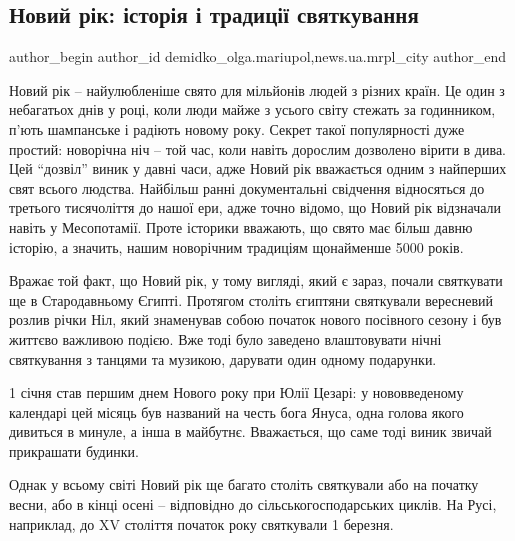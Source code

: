  
 
 
 
 
 
\subsection{Новий рік: історія і традиції святкування}
\label{sec:30_12_2017.stz.news.ua.mrpl_city.1.novyj_rik_istoria_tradicii}
 
\ifcmt
 author_begin
   author_id demidko_olga.mariupol,news.ua.mrpl_city
 author_end
\fi

Новий рік – найулюбленіше свято для мільйонів людей з різних країн. Це один з
небагатьох днів у році, коли люди майже з усього світу стежать за годинником,
п'ють шампанське і радіють новому року. Секрет такої популярності дуже простий:
новорічна ніч – той час, коли навіть дорослим дозволено вірити в дива. Цей
\enquote{дозвіл} виник у давні часи, адже Новий рік вважається одним з найперших свят
всього людства. Найбільш ранні документальні свідчення відносяться до третього
тисячоліття до нашої ери, адже точно відомо, що Новий рік відзначали навіть у
Месопотамії. Проте історики вважають, що свято має більш давню історію, а
значить, нашим новорічним традиціям щонайменше 5000 років.

Вражає той факт, що Новий рік, у тому вигляді, який є зараз, почали святкувати
ще в Стародавньому Єгипті. Протягом століть єгиптяни святкували вересневий
розлив річки Ніл, який знаменував собою початок нового посівного сезону і був
життєво важливою подією. Вже тоді було заведено влаштовувати нічні святкування
з танцями та музикою, дарувати один одному подарунки.

1 січня став першим днем Нового року при Юлії Цезарі: у нововведеному календарі
цей місяць був названий на честь бога Януса, одна голова якого дивиться в
минуле, а інша в майбутнє. Вважається, що саме тоді виник звичай прикрашати
будинки.

Однак у всьому світі Новий рік ще багато століть святкували або на початку
весни, або в кінці осені – відповідно до сільськогосподарських циклів. На Русі,
наприклад, до XV століття початок року святкували 1 березня.

